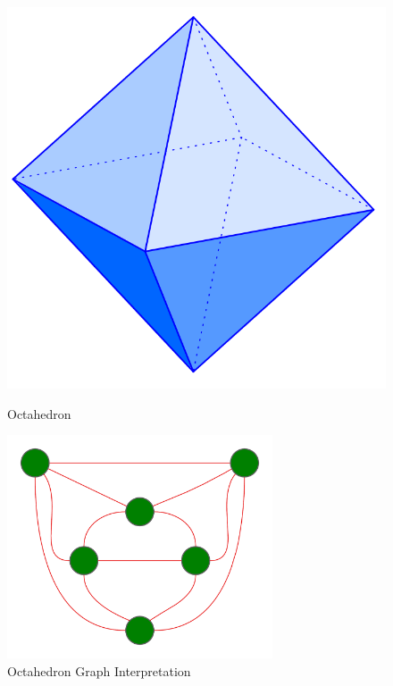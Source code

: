 \documentclass[bachelor, english]{algothesis}
\begin{document}
\begin{figure}[ht]
  \begin{minipage}{0.5\textwidth}
    \centering
    \includegraphics[width=0.7\linewidth]{figures/octahedron.png}
    \caption{Octahedron \protect\footnotemark}
    \label{fig:octahedron}
  \end{minipage}
  \begin{minipage}{0.5\textwidth}
    \centering
    \vspace{+0.8cm}
    \includegraphics[width=0.7\textwidth]{figures/octahedron_graph.png}
    \caption{Octahedron Graph Interpretation}
    \label{fig:octahedron_graph}
  \end{minipage}
\end{figure}
\end{document}
